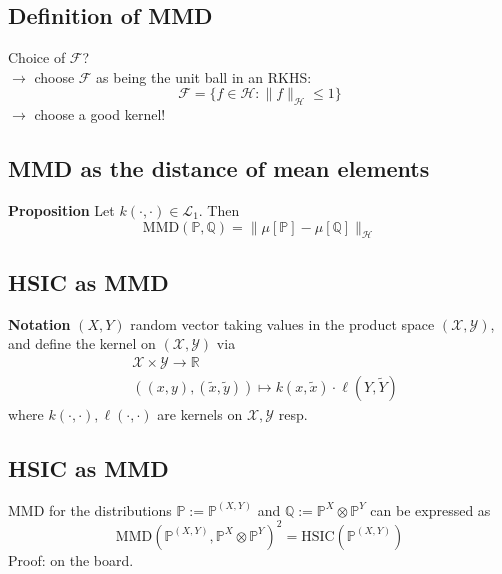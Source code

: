\clearpage

\subsection*{Definition of MMD}
Choice of $\mathcal{F}$?\\
$\rightarrow$ choose $\mathcal F$ as being the unit ball in an RKHS:
\begin{equation*}
\mathcal{F}=\{f\in\mathcal H:\|f\|_\mathcal H\leq 1\}
\end{equation*}
$\rightarrow$ choose a good kernel!

\clearpage

\subsection*{MMD as the distance of mean elements}
\textbf{Proposition}
Let $k(\cdot,\cdot)\in \mathcal{L}_1$. Then
\begin{equation*}
\text{MMD}(\mathbb P,\mathbb Q)=\|\mu[\mathbb{P}]-\mu[\mathbb{Q}]\|_\mathcal H
\end{equation*}

\clearpage

\subsection*{HSIC as MMD}
\textbf{Notation}
$(X,Y)$ random vector taking values in the product space $(\mathcal{X},\mathcal{Y})$, and define the kernel on $(\mathcal{X},\mathcal{Y})$ via
\begin{align*}
&\mathcal{X}\times\mathcal{Y}\rightarrow\mathbb{R}\\
&((x,y),(\tilde x,\tilde y))\mapsto k(x,\tilde x)\cdot \ell (Y,\tilde Y)
\end{align*}
where $k(\cdot,\cdot),\ell(\cdot,\cdot)$ are kernels on $\mathcal X,\mathcal Y$ resp.

\clearpage

\subsection*{HSIC as MMD}
MMD for the distributions $\mathbb P:=\mathbb{P}^{(X,Y)}$ and $\mathbb Q:=\mathbb{P}^{X}\otimes\mathbb{P}^{Y}$ can be expressed as
\begin{equation*}
\text{MMD}(\mathbb{P}^{(X,Y)},\mathbb{P}^{X}\otimes\mathbb{P}^{Y})^2=\text{HSIC}(\mathbb{P}^{(X,Y)})
\end{equation*}
Proof: on the board.

